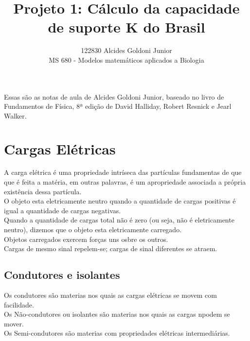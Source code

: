 \documentclass[a4paper]{article}
\title{Projeto 1: C\'{a}lculo da capacidade de suporte {K} do Brasil }
\author{122830 Alcides Goldoni Junior\\
  \small MS 680 - Modelos matem\'{a}ticos aplicados a Biologia\\
}%
\begin{document}
\maketitle
Essas s\~ao as notas de aula de Alcides Goldoni Junior, baseado no livro de Fundamentos de F\'isica, 8ª edi\c{c}\~ao de David Halliday, Robert Resnick e Jearl Walker.
\section{Cargas El\'etricas}
A carga el\'etrica \'e uma propriedade intr\'iseca das part\'iculas fundamentas de que que \'e feita a mat\'eria, em outras palavras, \'e um apropriedade associada a pr\'opria  exist\^encia dessa part\'icula.
\\
O objeto esta eletricamente \bold neutro quando a quantidade de cargas positivas \'e igual a quantidade de cargas negativas.
\\
Quando a quantidade de cargas total n\~ao \'e zero (ou seja, n\~ao \'e eletricamente neutro), dizemos que o objeto esta eletricamente carregado.
\\
Objetos carregados  exercem for\c{c}as uns osbre os outros.
\\
Cargas de mesmo sinal repelem-se; cargas de sinal diferentes se atraem.
\\
\subsection{Condutores e isolantes}
Os \bold condutores s\~ao materias nos quais as cargas el\'etricas se movem com facilidade.
\\
Os \bold N\~ao-\bold condutores ou \bold isolantes s\~ao materias nos quais as cargas n podem se mover.
\\
Os \bold Semi-\bold condutores s\~ao materias com propriedades el\'etricas intermedi\'arias.
\\



\begin{thebibliography}{99}
\end{thebibliography}
\end{document}
